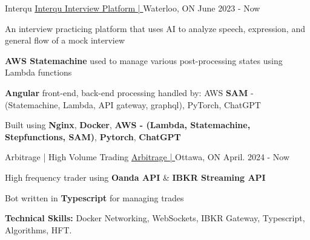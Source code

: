 \begin{cventries}
	\cventry
	{Interqu}  %
	{\underline{\href{https://github.com/Interqu}{Interqu Interview Platform | \ExternalLink}}} %
	{Waterloo, ON} %
	{June 2023 - Now} %
	{
		\begin{cvitems} %
			\item {An interview practicing platform that uses AI to analyze speech, expression, and general flow of a mock interview}
			\item {\textbf{AWS Statemachine} used to manage various post-processing states using Lambda functions}
			\item {\textbf{Angular} front-end, back-end processing handled by: AWS \textbf{SAM} - (Statemachine, Lambda, API gateway, graphql), PyTorch, ChatGPT}
			\item {Built using \textbf{Nginx}, \textbf{Docker}, \textbf{AWS - (Lambda, Statemachine, Stepfunctions, SAM)}, \textbf{Pytorch}, \textbf{ChatGPT}}
		\end{cvitems}
	}

	\cventry
	{Arbitrage | High Volume Trading}
	{\underline{\href{https://github.com/LefanHu/OARB}{Arbitrage | \ExternalLink}}} %
	{Ottawa, ON} %
	{April. 2024 - Now} %
	{
		\begin{cvitems} %
			\item {High frequency trader using \textbf{Oanda API} \& \textbf{IBKR Streaming API}}
			\item {Bot written in \textbf{Typescript} for managing trades}
			\item {\textbf{Technical Skills:} Docker Networking, WebSockets, IBKR Gateway, Typescript, Algorithms, HFT.}
		\end{cvitems}
	}







\end{cventries}
